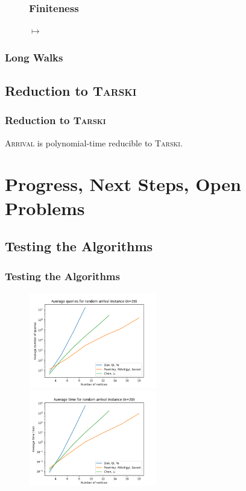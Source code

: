 \documentclass{beamer}
\begin{document}
\begin{frame}
\begin{figure}[ht]
  \frametitle{Finiteness}
  \centering
  \raisebox{-0.62\height}{}
  \hfil
  $\mapsto$
  \hfil
  \raisebox{-0.5\height}{}
  \end{figure}
  \end{frame}

\begin{frame}
\frametitle{Long Walks}
  \begin{figure}[h]
    \centering
    
  \end{figure}
\end{frame}


\subsection{Reduction to \textsc{Tarski}}
\begin{frame}
\frametitle{Reduction to \textsc{Tarski}}
    \begin{Theorem}
        \textsc{Arrival} is polynomial-time reducible to \textsc{Tarski}.
    \end{Theorem}
\end{frame}


\section{Progress, Next Steps, Open Problems}
\subsection{Testing the Algorithms}
\begin{frame}
\frametitle{Testing the Algorithms}
    \begin{figure}[t]
        \centering
        \includegraphics[width=2.2in]{avQueries.png}
        \centering
        \includegraphics[width=2.2in]{avTime.png}
    \end{figure}
\end{frame}
\end{document}
